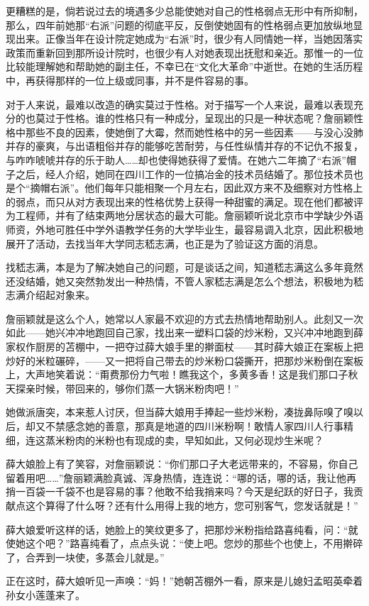 \par 更糟糕的是，倘若说过去的境遇多少总能使她对自己的性格弱点无形中有所抑制，那么，四年前她那“右派”问题的彻底平反，反倒使她固有的性格弱点更加放纵地显现出来。正像当年在设计院定她成为“右派”时，很少有人同情她一样，当她因落实政策而重新回到那所设计院时，也很少有人对她表现出抚慰和亲近。那惟一的一位比较能理解她和帮助她的副主任，不幸已在“文化大革命”中逝世。在她的生活历程中，再获得那样的一位上级或同事，并不是件容易的事。
\par 对于人来说，最难以改造的确实莫过于性格。对于描写一个人来说，最难以表现充分的也莫过于性格。谁的性格只有一种成分，呈现出的只是一种状态呢？詹丽颖性格中那些不良的因素，使她倒了大霉，然而她性格中的另一些因素——与没心没肺并存的豪爽，与出语粗俗并存的能够吃苦耐劳，与任性纵情并存的不记仇不报复，与咋咋唬唬并存的乐于助人……却也使得她获得了爱情。在她六二年摘了“右派”帽子之后，经人介绍，她同在四川工作的一位搞冶金的技术员结婚了。那位技术员也是个“摘帽右派”。他们每年只能相聚一个月左右，因此双方来不及细察对方性格上的弱点，而只从对方表现出来的性格优势上获得一种甜蜜的满足。现在他们都被评为工程师，并有了结束两地分居状态的最大可能。詹丽颖听说北京市中学缺少外语师资，外地可胜任中学外语教学任务的大学毕业生，最容易调入北京，因此积极地展开了活动，去找当年大学同志嵇志满，也正是为了验证这方面的消息。
\par 找嵇志满，本是为了解决她自己的问题，可是谈话之间，知道嵇志满这么多年竟然还没结婚，她又突然勃发出一种热情，不管人家嵇志满是怎么个想法，积极地为嵇志满介绍起对象来。
\par 詹丽颖就是这么个人，她常以人家最不欢迎的方式去热情地帮助别人。此刻又一次如此——她兴冲冲地跑回自己家，找出来一塑料口袋的炒米粉，又兴冲冲地跑到薛家权作厨房的苫棚中，一把夺过薛大娘手里的擀面杖——其时薛大娘正在案板上把炒好的米粒碾碎，——又一把将自己带去的炒米粉口袋撕开，把那炒米粉倒在案板上，大声地笑着说：“甭费那份力气啦！瞧我这个，多黄多香！这是我们那口子秋天探亲时候，带回来的，够你们蒸一大锅米粉肉吧！”
\par 她做派唐突，本来惹人讨厌，但当薛大娘用手捧起一些炒米粉，凑拢鼻际嗅了嗅以后，却又不禁感念她的善意，那真是地道的四川米粉啊！敢情人家四川人行事精细，连这蒸米粉肉的米粉也有现成的卖，早知如此，又何必现炒生米呢？
\par 薛大娘脸上有了笑容，对詹丽颖说：“你们那口子大老远带来的，不容易，你自己留着用吧……”詹丽颖满脸真诚、浑身热情，连连说：“哪的话，哪的话，我让他再捎一百袋一千袋不也是容易的事？他敢不给我捎来吗？今天是纪跃的好日子，我贡献点这个算得了什么呀？还有什么用得上我的地方，您可别客气，您发话就是！”
\par 薛大娘爱听这样的话，她脸上的笑纹更多了，把那炒米粉指给路喜纯看，问：“就使她这个吧？”路喜纯看了，点点头说：“使上吧。您炒的那些个也使上，不用擀碎了，合弄到一块使，多蒸会儿就是。”
\par 正在这时，薛大娘听见一声唤：“妈！”她朝苫棚外一看，原来是儿媳妇孟昭英牵着孙女小莲蓬来了。

